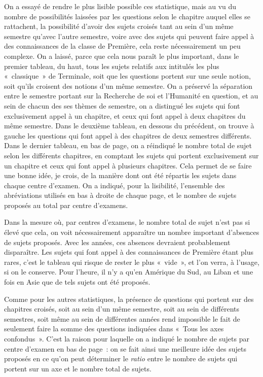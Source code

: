 On a essayé de rendre le plus lisible possible ces statistique, mais au vu du nombre de possibilités laissées par les questions selon le chapitre auquel elles se rattachent, la possibilité d'avoir des sujets croisés tant au sein d'un même semestre qu'avec l'autre semestre, voire avec des sujets qui peuvent faire appel à des connaissances de la classe de Première, cela reste nécessairement un peu complexe. On a laissé, parce que cela nous paraît le plus important, dans le premier tableau, du haut, tous les sujets relatifs aux intitulés les plus «~classique~» de Terminale, soit que les questions portent sur une seule notion, soit qu'ils croisent des notions d'un même semestre. On a préservé la séparation entre le semestre portant sur la Recherche de soi et l'Humanité en question, et au sein de chacun des ses thèmes de semestre, on a distingué les sujets qui font exclusivement appel à un chapitre, et ceux qui font appel à deux chapitres du même semestre. Dans le deuxième tableau, en dessous du précédent, on trouve à gauche les questions qui font appel à des chapitres de deux semestres différents. Dans le dernier tableau, en bas de page, on a réindiqué le nombre total de sujet selon les différents chapitres, en comptant les sujets qui portent exclusivement sur un chapitre et ceux qui font appel à plusieurs chapitres. Cela permet de se faire une bonne idée, je crois, de la manière dont ont été répartis les sujets dans chaque centre d'examen. On a indiqué, pour la lisibilité, l'ensemble des abréviations utilisés en bas à droite de chaque page, et le nombre de sujets proposés au total par centre d'examens.

Dans la mesure où, par centres d'examens, le nombre total de sujet n'est pas si élevé que cela, on voit nécessairement apparaître un nombre important d'absences de sujets proposés. Avec les années, ces absences devraient probablement disparaître. Les sujets qui font appel à des connaissances de Première étant plus rares, c'est le tableau qui risque de rester le plus «~vide~», et l'on verra, à l'usage, si on le conserve. Pour l'heure, il n'y a qu'en Amérique du Sud, au Liban et une fois en Asie que de tels sujets ont été proposés.

Comme pour les autres statistiques, la présence de questions qui portent sur des chapitres croisés, soit au sein d'un même semestre, soit au sein de différents semestres, soit même au sein de différentes années rend impossible le fait de seulement faire la somme des questions indiquées dans «~Tous les axes confondus~». C'est la raison pour laquelle on a indiqué le nombre de sujets par centre d'examen en bas de page~: on se fait ainsi une meilleure idée des sujets proposés en ce qu'on peut déterminer le \textit{ratio} entre le nombre de sujets qui portent sur un axe et le nombre total de sujets.

